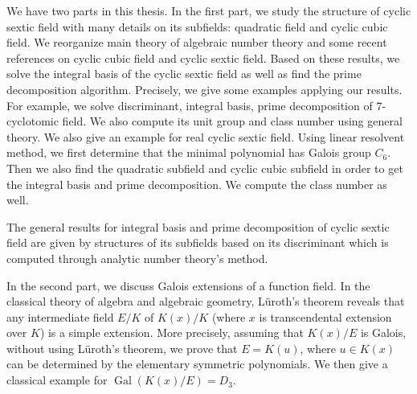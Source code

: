 \begin{enabstract}
We have two parts in this thesis. In the first part, we study the structure of cyclic sextic field with many details on its subfields: quadratic field and cyclic cubic field. We reorganize main theory of algebraic number theory and some recent references on cyclic cubic field and cyclic sextic field. Based on these results, we solve the integral basis of the cyclic sextic field as well as find the prime decomposition algorithm. Precisely, we give some examples applying our results. For example, we solve discriminant, integral basis, prime decomposition of 7-cyclotomic field. We also compute its unit group and class number using general theory. We also give an example for real cyclic sextic field. Using linear resolvent method, we first determine that the minimal polynomial has Galois group $C_6$. Then we also find the quadratic subfield and cyclic cubic subfield in order to get the integral basis and prime decomposition. We compute the class number as well.

The general results for integral basis and prime decomposition of cyclic sextic field are given by structures of its subfields based on its discriminant which is computed through analytic number theory's method. 

In the second part, we discuss Galois extensions of a function field. In the classical theory of algebra and algebraic geometry, L\"{u}roth's theorem reveals that any intermediate field $E/K$ of $K(x)/K$ (where $x$ is transcendental extension over $K$) is a simple extension. More precisely, assuming that $K(x)/E$ is Galois, without using L\"{u}roth's theorem, we prove that $E=K(u)$, where $u\in K(x)$ can be determined by the elementary symmetric polynomials. We then give a classical example for $\operatorname{Gal}(K(x)/E)=D_3$.   

\end{enabstract}
